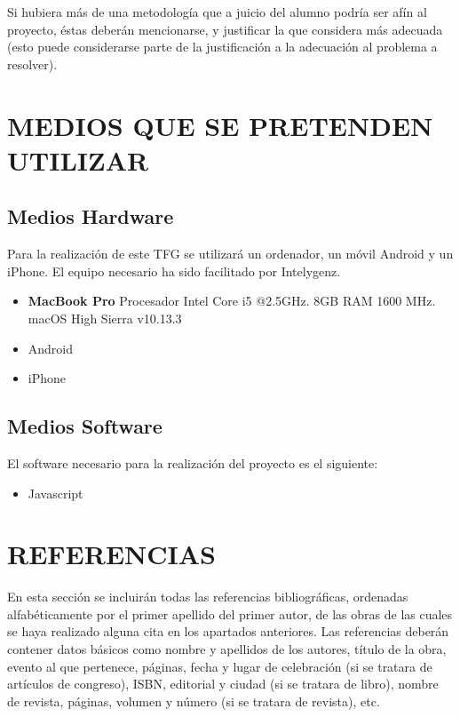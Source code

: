 \documentclass{pre-tfg}
\begin{document}
Si hubiera más de una metodología que a juicio del alumno podría ser afín al proyecto,
éstas deberán mencionarse, y justificar la que considera más adecuada (esto puede
considerarse parte de la justificación a la adecuación al problema a resolver).


\section{MEDIOS QUE SE PRETENDEN UTILIZAR}

\subsection{Medios Hardware}

Para la realización de este TFG se utilizará un ordenador, un móvil Android y un iPhone.
El equipo necesario ha sido facilitado por Intelygenz.
\begin{itemize}
  \item \textbf{MacBook Pro} Procesador Intel Core i5 @2.5GHz. 8GB RAM 1600 MHz. macOS High Sierra v10.13.3
  \item Android
  \item iPhone
\end{itemize}

\subsection{Medios Software}

El software necesario para la realización del proyecto es el siguiente:
\begin{itemize}
  \item Javascript~\cite{ECMA}
\end{itemize}


\section{REFERENCIAS}

En esta sección se incluirán todas las referencias bibliográficas, ordenadas
alfabéticamente por el primer apellido del primer autor, de las obras de las cuales se
haya realizado alguna cita en los apartados anteriores. Las referencias deberán contener
datos básicos como nombre y apellidos de los autores, título de la obra, evento al que
pertenece, páginas, fecha y lugar de celebración (si se tratara de artículos de congreso),
ISBN, editorial y ciudad (si se tratara de libro), nombre de revista, páginas, volumen y
número (si se tratara de revista), etc.
\end{document}
